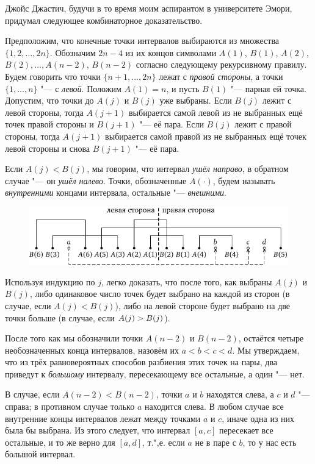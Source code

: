 \documentclass[twoside]{book}
\begin{document}
Джойс Джастич, %
будучи в то время моим аспирантом в университете Эмори, придумал следующее комбинаторное доказательство.
 
\medskip

Предположим, что конечные точки интервалов выбираются из множества $\{1,2,\dots,2n\}$.
Обозначим $2n-4$ из их концов символами $A(1)$, $B(1)$, $A(2)$, $B(2),\dots, A(n-2)$, $B(n-2)$ согласно следующему рекурсивному правилу.
Будем говорить что точки $\{n+1, \dots , 2n\}$ лежат с \emph{правой стороны}, а точки $\{1, \dots , n\}$ "--- с \emph{левой}.
Положим $A(1)=n$, и пусть $B(1)$ "--- парная ей точка.
Допустим, что точки до $A(j)$ и $B(j)$ уже выбраны. 
Если $B(j)$ лежит с левой стороны, тогда $A(j+1)$ выбирается самой левой из не выбранных ещё точек правой стороны и $B(j+1)$ "--- её пара.
Если $B(j)$ лежит с правой стороны, тогда $A(j+1)$ выбирается самой правой из не выбранных ещё точек левой стороны и снова $B(j+1)$ "--- её пара.

Если $A(j) < B(j)$, мы говорим, что интервал \emph{ушёл направо}, в обратном случае "--- он \emph{ушёл налево}.
Точки, обозначенные $A(\cdot )$, будем называть \emph{внутренними} концами интервала, остальные "--- \emph{внешними}.

\begin{figure}[!ht]
\centering
\includegraphics{mp/wink-5}
\end{figure} 

Используя индукцию по $j$, легко доказать, что после того, как выбраны $A(j)$ и $B(j)$, либо одинаковое число точек будет выбрано на каждой из сторон (в случае, если $A(j) < B(j)$), либо на левой стороне будет выбрано на две точки больше (в случае, если $A(j) \z> B(j)$).

После того как мы обозначили точки $A(n-2)$ и $B(n-2)$, остаётся четыре необозначенных конца интервалов, назовём их $a<b<c<d$.
Мы утверждаем, что из трёх равновероятных способов разбиения этих точек на пары, два приведут к \emph{большому} интервалу, пересекающему все остальные, а один "--- нет.

В случае, если $A(n-2) < B(n-2)$, точки $a$ и $b$ находятся слева, а $c$ и $d$ "--- справа;
в противном случае только $a$ находится слева.
В любом случае все внутренние концы интервалов лежат между точками $a$ и $c$, иначе одна из них была бы выбрана.
Из этого следует, что интервал $[a,c]$ пересекает все остальные, и то же верно для $[a,d]$, т.",е. если $a$ не в паре с $b$, то у нас есть большой интервал.
\end{document}
